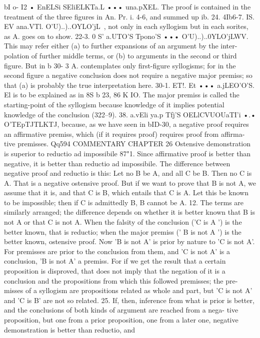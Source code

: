 {{{{{{{{{{{{{{{{{{{{{{{{{{{{{{{{{{bI o- I2 • EnELSi} SEliELKTa.L ••• una.pXEL. The proof is contained
in the treatment of the three figures in An. Pr. i. 4-6, and summed
up ib. 24. 4Ib6-7.
IS. EV ana.VTl. O'U)..)..OYLO'jL~, not only in each syllogism but in
each sorites, as A. goes on to show.
22-3. 0 S' a.UTO'S Tpono'S ••• O'U)..)..0YLO'jLWV. This may refer
either (a) to further expansions of an argument by the inter-
polation of further middle terms, or (b) to arguments in the second
or third figure. But in b 30- 3 A. contemplates only first-figure
syllogisms; for in the second figure a negative conclusion does
not require a negative major premiss; so that (a) is probably the
true interpretation here.
30-1. ET!. Et ••• a.jLEO'O'S. El is to be explained as in 8S b 23,
86 K IO. The major premiss is called the starting-point of the
syllogism because knowledge of it implies potential knowledge
of the conclusion (322--9).
38. a.vEli ya.p Tfj'S OELlCVUOUaTI'i •.• O'TEpTJTLKTJ, because, as we
have seen in bID-30, a negative proof requires an affirmative
premiss, which (if it requires proof) requires proof from affirma-
tive premisses.
Qq594
COMMENTARY
CHAPTER 26
Ostensive demonstration is superior to reductio ad impossibile
87"1. Since affirmative proof is better than negative, it is
better than reductio ad impossibile. The difference between
negative proof and reductio is this: Let no B be A, and all C be B.
Then no C is A. That is a negative ostensive proof. But if we
want to prove that B is not A, we assume that it is, and that C is
B, which entails that C is A. Let this be known to be impossible;
then if C is admittedly B, B cannot be A.
12. The terms are similarly arranged; the difference depends
on whether it is better known that B is not A or that C is not A.
When the falsity of the conclusion ('C is A ') is the better known,
that is reductio; when the major premiss (' B is not A ') is the
better known, ostensive proof. Now 'B is not A' is prior by
nature to 'C is not A'. For premisses are prior to the conclusion
from them, and 'C is not A' is a conclusion, 'B is not A' a premiss.
For if we get the result that a certain proposition is disproved,
that does not imply that the negation of it is a conclusion and
the propositions from which this followed premisses; the pre-
misses of a syllogism are propositions related as whole and part,
but 'C is not A' and 'C is B' are not so related.
25. If, then, inference from what is prior is better, and the
conclusions of both kinds of argument are reached from a nega-
tive proposition, but one from a prior proposition, one from
a later one, negative demonstration is better than reductio, and
}}}}}}}}}}}}}}}}}}}}}}}}}}}}}}}}}

